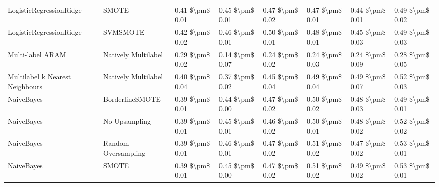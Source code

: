 \begin{tabular}{llllllll}
        LogisticRegressionRidge &                         SMOTE & 0.41 \$\textbackslash pm\$ 0.01 &           0.45 \$\textbackslash pm\$ 0.01 &       0.47 \$\textbackslash pm\$ 0.02 &        0.47 \$\textbackslash pm\$ 0.01 &                         0.44 \$\textbackslash pm\$ 0.01 &     0.49 \$\textbackslash pm\$ 0.02 \\
        LogisticRegressionRidge &                      SVMSMOTE & 0.42 \$\textbackslash pm\$ 0.02 &           0.46 \$\textbackslash pm\$ 0.01 &       0.50 \$\textbackslash pm\$ 0.01 &        0.48 \$\textbackslash pm\$ 0.01 &                         0.45 \$\textbackslash pm\$ 0.03 &     0.49 \$\textbackslash pm\$ 0.03 \\
               Multi-label ARAM &           Natively Multilabel & 0.29 \$\textbackslash pm\$ 0.02 &           0.14 \$\textbackslash pm\$ 0.07 &       0.24 \$\textbackslash pm\$ 0.02 &        0.24 \$\textbackslash pm\$ 0.03 &                         0.24 \$\textbackslash pm\$ 0.09 &     0.28 \$\textbackslash pm\$ 0.05 \\
Multilabel k Nearest Neighbours &           Natively Multilabel & 0.40 \$\textbackslash pm\$ 0.04 &           0.37 \$\textbackslash pm\$ 0.02 &       0.45 \$\textbackslash pm\$ 0.04 &        0.49 \$\textbackslash pm\$ 0.04 &                         0.49 \$\textbackslash pm\$ 0.07 &     0.52 \$\textbackslash pm\$ 0.03 \\
                     NaiveBayes &               BorderlineSMOTE & 0.39 \$\textbackslash pm\$ 0.01 &           0.44 \$\textbackslash pm\$ 0.00 &       0.47 \$\textbackslash pm\$ 0.02 &        0.50 \$\textbackslash pm\$ 0.02 &                         0.48 \$\textbackslash pm\$ 0.03 &     0.49 \$\textbackslash pm\$ 0.01 \\
                     NaiveBayes &                 No Upsampling & 0.39 \$\textbackslash pm\$ 0.01 &           0.45 \$\textbackslash pm\$ 0.01 &       0.46 \$\textbackslash pm\$ 0.02 &        0.50 \$\textbackslash pm\$ 0.01 &                         0.48 \$\textbackslash pm\$ 0.02 &     0.52 \$\textbackslash pm\$ 0.02 \\
                     NaiveBayes &           Random Oversampling & 0.39 \$\textbackslash pm\$ 0.01 &           0.46 \$\textbackslash pm\$ 0.01 &       0.47 \$\textbackslash pm\$ 0.02 &        0.51 \$\textbackslash pm\$ 0.02 &                         0.47 \$\textbackslash pm\$ 0.02 &     0.53 \$\textbackslash pm\$ 0.01 \\
                     NaiveBayes &                         SMOTE & 0.39 \$\textbackslash pm\$ 0.01 &           0.45 \$\textbackslash pm\$ 0.00 &       0.47 \$\textbackslash pm\$ 0.02 &        0.51 \$\textbackslash pm\$ 0.02 &                         0.49 \$\textbackslash pm\$ 0.02 &     0.53 \$\textbackslash pm\$ 0.01 \\

\end{tabular}
